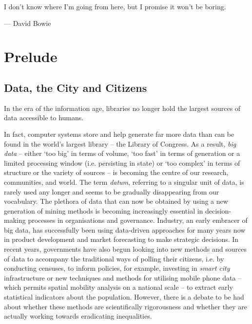 \begin{introduction}\label{introduction}

\epigraph{I don't know where I'm going from here, but I promise it won't be boring.}{--- \textup{David Bowie}}

\section{Prelude}
\subsection{Data, the City and Citizens}
\hypertarget{introduction}{In the era of the information age, libraries no longer hold the largest sources of data accessible to humans.} In fact, computer systems store and help generate far more data than can be found in the world's largest library -- the Library of Congress. As a result, \textit{big data} -- either `too big' in terms of volume, `too fast' in terms of generation or a limited processing window (i.e. persisting in state) or `too complex' in terms of structure or the variety of sources -- is becoming the centre of our research, communities, and world. The term \textit{datum}, referring to a singular unit of data, is rarely used any longer and seems to be gradually disappearing from our vocabulary. The plethora of data that can now be obtained by using a new generation of mining methods is becoming increasingly essential in decision-making processes in organisations and governance. Industry, an early embracer of big data, has successfully been using data-driven approaches for many years now in product development and market forecasting to make strategic decisions. In recent years, governments have also begun looking into new methods and sources of data to accompany the traditional ways of polling their citizens, i.e. by conducting censuses, to inform policies, for example, investing in \textit{smart city} infrastructure or new techniques and methods for utilising mobile phone data -- which permits spatial mobility analysis on a national scale -- to extract early statistical indicators about the population. However, there is a debate to be had about whether these methods are scientifically rigorousness and whether they are actually working towards eradicating inequalities.


\end{introduction}

